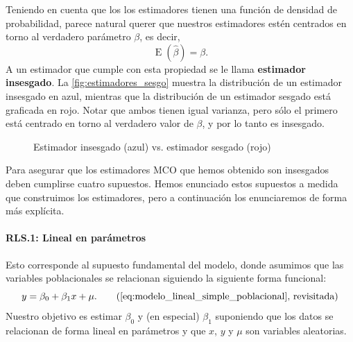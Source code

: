 \documentclass{report}\usepackage[]{graphicx}\usepackage[]{color}
\newcommand*{\kw}[1]{\textbf{#1}\index{#1}}
\newcommand{\E}{\operatorname{E}}
\begin{document}
Teniendo en cuenta que los los estimadores tienen una función de densidad de probabilidad, parece natural querer que nuestros estimadores estén centrados en torno al verdadero parámetro $\beta$, es decir,
\begin{equation}
\E(\hat \beta) = \beta.
\end{equation}
A un estimador que cumple con esta propiedad se le llama \kw{ estimador insesgado}.
La \autoref{fig:estimadores_sesgo} muestra la distribución de un estimador insesgado en azul, mientras que la distribución de un estimador sesgado está graficada en rojo.
Notar que ambos tienen igual varianza, pero sólo el primero está centrado en torno al verdadero valor de $\beta$, y por lo tanto es insesgado.

\begin{figure}[htb]
  \centering
  \caption{Estimador insesgado (azul) vs. estimador sesgado (rojo)}
  \label{fig:estimadores_sesgo}
\end{figure}%

Para asegurar que los estimadores MCO que hemos obtenido son insesgados deben cumplirse cuatro supuestos.
Hemos enunciado estos supuestos a medida que construimos los estimadores, pero a continuación los enunciaremos de forma más explícita.

\paragraph{RLS.1: Lineal en parámetros} Esto corresponde al supuesto fundamental del modelo, donde asumimos que las variables poblacionales se relacionan siguiendo la siguiente forma funcional:
\begin{equation}
y = \beta_0 + \beta_1 x + \mu. \tag{\ref{eq:modelo_lineal_simple_poblacional}, revisitada}
\end{equation}
Nuestro objetivo es estimar $\beta_0$ y (en especial) $\beta_1$ suponiendo que los datos se relacionan de forma lineal en parámetros y que $x$, $y$ y $\mu$ son variables aleatorias.
\end{document}
